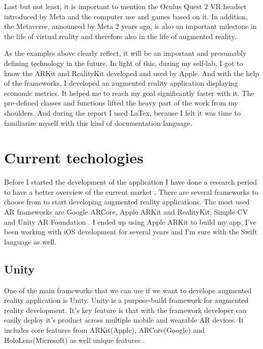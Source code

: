 \documentclass[a4paper,oneside]{article}
\begin{document}
Last but not least, it is important to mention the Oculus Quest 2 VR headset introduced by Meta and the computer use and games based on it. In addition, the Metaverse, announced by Meta 2 years ago, is also an important milestone in the life of virtual reality and therefore also in the life of augmented reality.

As the examples above clearly reflect, it will be an important and presumably defining technology in the future. In light of this, during my self-lab, I got to know the ARKit and RealityKit developed and used by Apple. And with the help of the frameworks, I developed an augmented reality application displaying economic metrics. It helped me to reach my goal significantly faster with it. The pre-defined classes and functions lifted the heavy part of the work from my shoulders. And during the report I used LaTex, because I felt it was time to familiarize myself with this kind of documentation language.

\newpage
\section{Current techologies}
\label{sec:az-elvegzett-munka}

Before I started the development of the application I have done a research period to have a better overview of the current market \cite{microsoftAr}.
There are several frameworks to choose from to start developing augmented reality applications. The most used AR frameworks are Google ARCore, Apple ARKit and RealityKit, Simple CV and Unity AR Foundation \cite{appleAr} \cite{appleArRealityKit}.
I ended up using Apple ARKit to build my app. I've been working with iOS development for several years and I'm sure with the Swift language as well.


\subsection{Unity}
\label{sec:a-munkam-ismert}

One of the main frameworks that we can use if we want to develope augmented reality application is Unity.
Unity is a purpose-build framework for augmented reality development.  It's key feature is that with the framework developer can easily deploy it's product across multiple mobile and wearable AR devices. It includes core features from ARKit(Apple), ARCore(Google) and HoloLens(Microsoft) as well unique features \cite{unity}.
\end{document}
